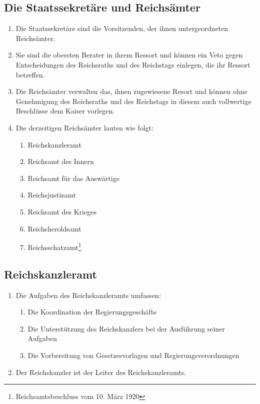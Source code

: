 \documentclass{article}
\begin{document}
\subsection{Die Staatssekretäre und Reichsämter}
\begin{enumerate}[(1)]
    \item Die Staatssekretäre sind die Vorsitzenden, der ihnen untergeordneten Reichsämter.
    \item Sie sind die obersten Berater in ihrem Ressort und können ein Veto gegen Entscheidungen des Reichsraths und des Reichstags einlegen, die ihr Ressort betreffen.
    \item Die Reichsämter verwalten das, ihnen zugewiesene Resort und können ohne Genehmigung des Reichsraths und des Reichstags in diesem auch vollwertige Beschlüsse dem Kaiser vorlegen.
    \item Die derzeitigen Reichsämter lauten wie folgt:
    \begin{enumerate}[1.]
        \item Reichskanzleramt
        \item Reichsamt des Innern
        \item Reichsamt für das Auswärtige
        \item Reichsjustizamt
        \item Reichsamt des Krieges
        \item Reichsheroldsamt
        \item Reichsschatzamt\footnote{Reichsamtsbeschluss vom 10. März 1920}
    \end{enumerate}
\end{enumerate}

\subsection{Reichskanzleramt}
\begin{enumerate}[(1)]
    \item Die Aufgaben des Reichskanzleramts umfassen:
    \begin{enumerate}[1.]
        \item Die Koordination der Regierungsgeschäfte
        \item Die Unterstützung des Reichskanzlers bei der Ausführung seiner Aufgaben
        \item Die Vorbereitung von Gesetzesvorlagen und Regierungsverordnungen
    \end{enumerate}
    \item Der Reichskanzler ist der Leiter des Reichskanzleramts.
\end{enumerate}
\end{document}
